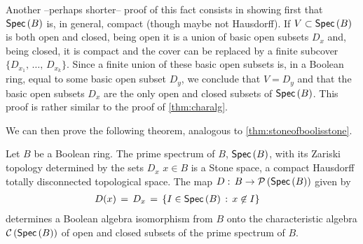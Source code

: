 \begin{remarkShorterProof}
	Another --perhaps shorter-- proof of this fact consists in showing
	first that $\mathsf{Spec}\left(B\right)$ is, in general, compact (though maybe not
	Hausdorff). If $V\subset\mathsf{Spec}\left(B\right)$ is both open and closed, being
	open it is a union of basic open subsets $D_{x}$ and, being closed,
	it is compact and the cover can be replaced by a finite subcover
	$\{D_{x_{1}},\,\dots,\,D_{x_{k}}\}$. Since a finite union of
	these basic open subsets is, in a Boolean ring, equal to some
	basic open subset $D_{y}$, we conclude that $V= D_{y}$ and that
	the basic open subsets $D_{x}$ are the only open and closed subsets
	of $\mathsf{Spec}\left(B\right)$. This proof is rather similar to the proof of
	\ref{thm:charalg}.
\end{remarkShorterProof}

We can then prove the following theorem, analogous to
\ref{thm:stoneofboolisstone}.

\begin{thmBoolIsCharOfSpec}\label{thm:boolischarofspec}
	Let $B$ be a Boolean ring. The prime spectrum of $B$, $\mathsf{Spec}\left(B\right)$,
	with its Zariski topology determined by the sets $D_{x}$ $x\in B$
	is a Stone space, a compact Hausdorff totally disconnected
	topological space. The map $D:\,B\rightarrow\mathcal{P}\left(\mathsf{Spec}\left(B\right)\right)$
	given by
	\begin{align*}
		D(x) & \,=\, D_{x} \,=\,\left\lbrace I\in\mathsf{Spec}\left(B\right)\,:\,
			x\not\in I\right\rbrace
	\end{align*}
	determines a Boolean algebra isomorphism from $B$ onto the
	characteristic algebra $\mathcal{C}\left(\mathsf{Spec}\left(B\right)\right)$ of open and closed
	subsets of the prime spectrum of $B$.
\end{thmBoolIsCharOfSpec}


